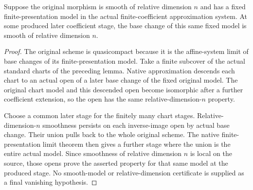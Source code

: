 \begin{theorem}
\label{thm:kn-arithmetic-original-dimension-spread}
\leanok
{}
Suppose the original morphism is smooth of relative dimension $n$ and
has a fixed finite-presentation model in the actual finite-coefficient
approximation system. At some produced later coefficient stage, the
base change of this same fixed model is smooth of relative dimension
$n$.
\end{theorem}
\begin{proof}
The original scheme is quasicompact because it is the affine-system
limit of base changes of its finite-presentation model. Take a finite
subcover of the actual standard charts of the preceding lemma.
Native approximation descends each chart to an actual open of a later
base change of the fixed original model. The original chart model and
this descended open become isomorphic after a further coefficient
extension, so the open has the same relative-dimension-$n$ property.

Choose a common later stage for the finitely many chart stages.
Relative-dimension-$n$ smoothness persists on each inverse-image open
by actual base change. Their union pulls back to the whole original
scheme. The native finite-presentation limit theorem then gives a
further stage where the union is the entire actual model. Since
smoothness of relative dimension $n$ is local on the source, those
opens prove the asserted property for that same model at the produced
stage. No smooth-model or relative-dimension certificate is supplied
as a final vanishing hypothesis.
\end{proof}

